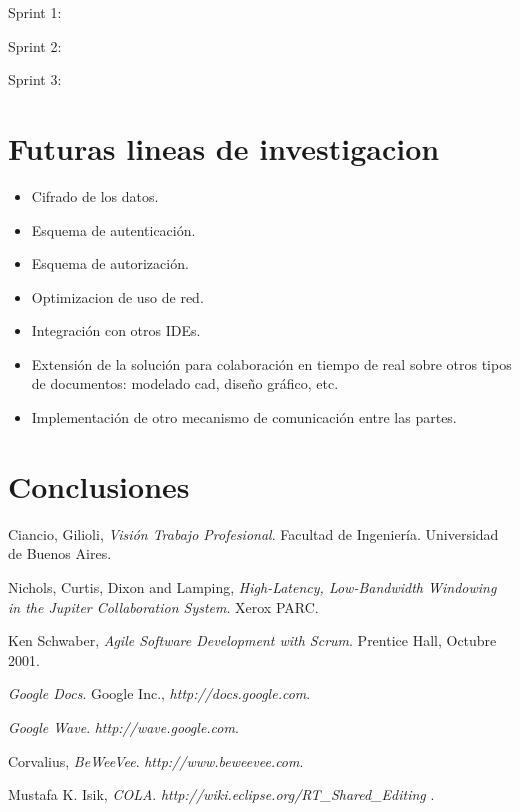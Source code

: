 \documentclass[12pt,a4paper]{article}
\begin{document}
Sprint 1: 

Sprint 2:

Sprint 3:

\section{Futuras lineas de investigacion}

\begin{itemize}
	\item Cifrado de los datos.
	\item Esquema de autenticación.
	\item Esquema de autorización.
	\item Optimizacion de uso de red.
	\item Integración con otros IDEs.
	\item Extensión de la solución para colaboración en tiempo de real sobre otros tipos de documentos: modelado cad,
	diseño gráfico, etc.
	\item Implementación de otro mecanismo de comunicación entre las partes.
\end{itemize}

\section{Conclusiones}

\newpage
\begin{thebibliography}{9}
	Ciancio, Gilioli,
	\emph{Visión Trabajo Profesional}.
	Facultad de Ingeniería.
	Universidad de Buenos Aires. 

	Nichols, Curtis, Dixon and Lamping,
	\emph{High-Latency, Low-Bandwidth Windowing in the Jupiter Collaboration System}.
	Xerox PARC.

	Ken Schwaber,
	\emph{Agile Software Development with Scrum}.
	Prentice Hall, 
	Octubre 2001.
	
	\emph{Google Docs}. 
	Google Inc., 
	\textsl{http://docs.google.com}.
	
	\emph{Google Wave}. 
	\textsl{http://wave.google.com}.

	Corvalius,
	\emph{BeWeeVee}. 
	\textsl{http://www.beweevee.com}.
	
	Mustafa K. Isik,
	\emph{COLA}. 
	\textsl{ http://wiki.eclipse.org/RT\_Shared\_Editing }.
		
\end{thebibliography}
\end{document}
